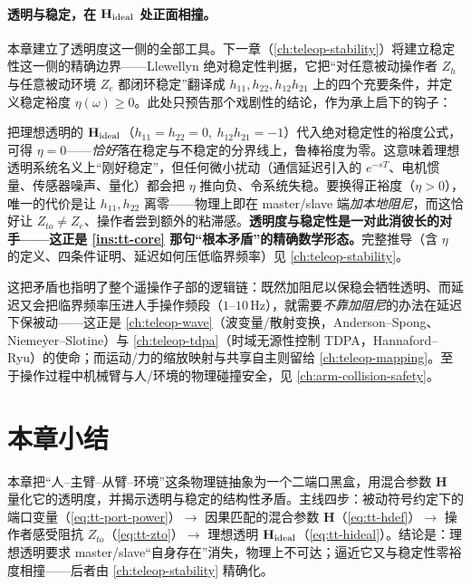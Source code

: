 \paragraph{透明与稳定，在 $\mathbf H_{\rm ideal}$ 处正面相撞。}
本章建立了透明度这一侧的全部工具。下一章（\cref{ch:teleop-stability}）将建立稳定性这一侧的精确边界——Llewellyn 绝对稳定性判据，它把“对任意被动操作者 $Z_h$ 与任意被动环境 $Z_e$ 都闭环稳定”翻译成 $h_{11},h_{22},h_{12}h_{21}$ 上的四个充要条件，并定义稳定裕度 $\eta(\omega)\ge0$。此处只预告那个戏剧性的结论，作为承上启下的钩子：

\begin{insight}\label{ins:tt-tradeoff}
把理想透明的 $\mathbf H_{\rm ideal}$（$h_{11}=h_{22}=0,\ h_{12}h_{21}=-1$）代入绝对稳定性的裕度公式，可得 $\eta=0$——\emph{恰好}落在稳定与不稳定的分界线上，鲁棒裕度为零。这意味着理想透明系统名义上“刚好稳定”，但任何微小扰动（通信延迟引入的 $e^{-sT}$、电机惯量、传感器噪声、量化）都会把 $\eta$ 推向负、令系统失稳。要换得正裕度（$\eta>0$），唯一的代价是让 $h_{11},h_{22}$ 离零——物理上即在 master/slave 端\emph{加本地阻尼}，而这恰好让 $Z_{to}\neq Z_e$、操作者尝到额外的粘滞感。\textbf{透明度与稳定性是一对此消彼长的对手——这正是 \cref{ins:tt-core} 那句“根本矛盾”的精确数学形态。}完整推导（含 $\eta$ 的定义、四条件证明、延迟如何压低临界频率）见 \cref{ch:teleop-stability}。
\end{insight}

这把矛盾也指明了整个遥操作子部的逻辑链：既然加阻尼以保稳会牺牲透明、而延迟又会把临界频率压进人手操作频段（$1$--$10\,\mathrm{Hz}$），就需要\emph{不靠加阻尼}的办法在延迟下保被动——这正是 \cref{ch:teleop-wave}（波变量/散射变换，Anderson--Spong\cite{anderson1989bilateral}、Niemeyer--Slotine\cite{niemeyer1991stable}）与 \cref{ch:teleop-tdpa}（时域无源性控制 TDPA，Hannaford--Ryu\cite{hannaford2002time}）的使命；而运动/力的缩放映射与共享自主则留给 \cref{ch:teleop-mapping}。至于操作过程中机械臂与人/环境的物理碰撞安全，见 \cref{ch:arm-collision-safety}。

\section{本章小结}
\label{sec:tt-summary}

本章把“人--主臂--从臂--环境”这条物理链抽象为一个二端口黑盒，用混合参数 $\mathbf H$ 量化它的透明度，并揭示透明与稳定的结构性矛盾。主线四步：被动符号约定下的端口变量（\cref{eq:tt-port-power}）$\to$ 因果匹配的混合参数 $\mathbf H$（\cref{eq:tt-hdef}）$\to$ 操作者感受阻抗 $Z_{to}$（\cref{eq:tt-zto}）$\to$ 理想透明 $\mathbf H_{\rm ideal}$（\cref{eq:tt-hideal}）。结论是：理想透明要求 master/slave“自身存在”消失，物理上不可达；逼近它又与稳定性零裕度相撞——后者由 \cref{ch:teleop-stability} 精确化。

